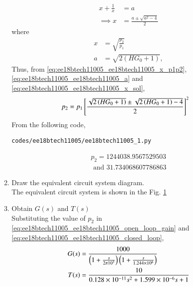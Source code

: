 \begin{enumerate}[label=\arabic*.,ref=\theenumi]
\begin{align}
\label{eq:ee18btech11005_ee18btech11005_x}
x + \frac{1}{x} &= a
\\
\implies x &= \frac{a \pm \sqrt{a^2 -4}}{2}
\label{eq:ee18btech11005_ee18btech11005_x_sol}
\end{align}
%
where 
\begin{align}
\label{eq:ee18btech11005_ee18btech11005_x_p1p2}
x  &= \sqrt{\frac{p_2}{p_1}}
\\
a &= \sqrt{2(HG_0+1)}, 
\label{eq:ee18btech11005_ee18btech11005_a}
\end{align}
Thus, from \eqref{eq:ee18btech11005_ee18btech11005_x_p1p2}, \eqref{eq:ee18btech11005_ee18btech11005_a}
and \eqref{eq:ee18btech11005_ee18btech11005_x_sol},
%
\begin{align}
p_2 &= p_1{}\left[\frac{\sqrt{2\left(HG_0+1\right)} \pm \sqrt{2 \left(HG_0+1\right)-4}}{2}\right]^2
\end{align}
%
From the following code,
\begin{lstlisting}
codes/ee18btech11005/ee18btech11005_1.py
\end{lstlisting}
%
\begin{multline}
p_2 = 1244038.9567529503 
\\
\text{ and } 31.734068607786863
\end{multline}
%
\item  Draw the equivalent circuit system diagram.\\
\solution
The equivalent circuit system is shown in the Fig. \ref{fig:equivalent_system}
\begin{figure}[!hbt]
	\begin{center}
			\resizebox{\columnwidth}{!}{}
	\end{center}
\caption{}
\label{fig:equivalent_system}
\end{figure}
\item Obtain $G(s)$ and $T(s)$
\\
\solution Substituting the value of $p_2$ in  \eqref{eq:ee18btech11005_ee18btech11005_open_loop_gain} and \eqref{eq:ee18btech11005_ee18btech11005_closed_loop},
\begin{align}
     G(s) &= \frac{1000}{\left(1+\frac{s}{2\pi10^3}\right)\left(1+\frac{s}{1.244\times10^6}\right)}
    \label{eq:ee18btech11005_ee18btech11005_G(s)}
\\
    T(s) &= \frac{10}{0.128\times10^{-11}s^2+1.599\times10^{-6}s+1}
    \label{eq:ee18btech11005_ee18btech11005_Transfer_func}
\end{align}


\end{enumerate}
